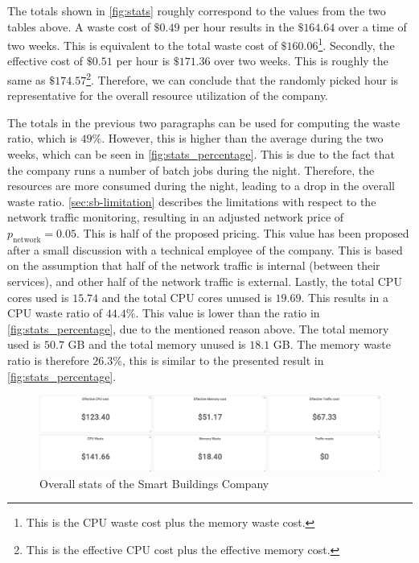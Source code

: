 \noindent
The totals shown in \autoref{fig:stats} roughly correspond to the values from the two tables above. A waste cost of $\$0.49$ per hour results in the $\$164.64$ over a time of two weeks. This is equivalent to the total waste cost of $\$160.06$\footnote{This is the CPU waste cost plus the memory waste cost.}. Secondly, the effective cost of $\$0.51$ per hour is $\$171.36$ over two weeks. This is roughly the same as $\$174.57$\footnote{This is the effective CPU cost plus the effective memory cost.}. Therefore, we can conclude that the randomly picked hour is representative for the overall resource utilization of the company.


\noindent
The totals in the previous two paragraphs can be used for computing the waste ratio, which is $49\%$. However, this is higher than the average during the two weeks, which can be seen in \autoref{fig:stats_percentage}. This is due to the fact that the company runs a number of batch jobs during the night. Therefore, the resources are more consumed during the night, leading to a drop in the overall waste ratio. \autoref{sec:sb-limitation} describes the limitations with respect to the network traffic monitoring, resulting in an adjusted network price of $p_\text{network} = 0.05$. This is half of the proposed pricing. This value has been proposed after a small discussion with a technical employee of the company. This is based on the assumption that half of the network traffic is internal (between their services), and other half of the network traffic is external. Lastly, the total CPU cores used is $15.74$ and the total CPU cores unused is $19.69$. This results in a CPU waste ratio of $44.4\%$. This value is lower than the ratio in \autoref{fig:stats_percentage}, due to the mentioned reason above. The total memory used is $50.7$ GB and the total memory unused is $18.1$ GB. The memory waste ratio is therefore $26.3\%$, this is similar to the presented result in \autoref{fig:stats_percentage}.

\begin{figure}
    \centering
    \includegraphics[width=\textwidth]{gfx/stats.png}
    \caption{Overall stats of the Smart Buildings Company}
    \label{fig:stats}
\end{figure}

